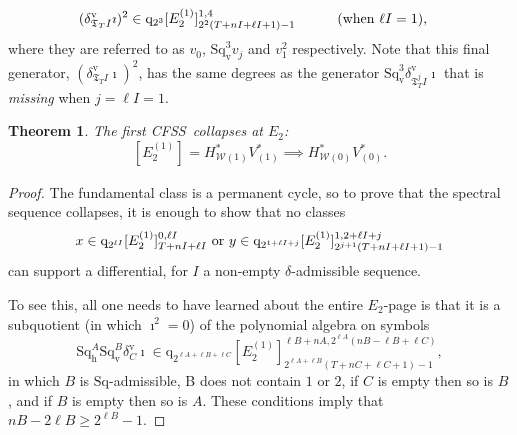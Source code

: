 \documentclass[11pt]{amsart} \renewcommand{\baselinestretch}{1.2}
\theoremstyle{plain}
\newtheorem{thm}{Theorem}[section] %
\numberwithin{equation}{section} %
\theoremstyle{plain}
\newtheorem{thm}{Theorem}[chapter] %
\numberwithin{equation}{chapter} %
\newcommand{\calw}{\mathcal{W}}
\newcommand{\quadgrad}[1]{\mathrm{q}_{#1}}
\newcommand{\Sq}{\mathrm{Sq}}
\newcommand{\TOP}{\mathfrak{T}}
\newcommand{\E}[5]{[E^{#1}_{#2}#3]^{#4}_{#5}}
\newcommand{\uver}{^\mathrm{v}}
\newcommand{\dver}{_\mathrm{v}}
\newcommand{\dhor}{_\mathrm{h}}
\newcommand{\Sqh}{\mathrm{Sq}\dhor}
\newcommand{\Sqv}{\mathrm{Sq}\dver}
\newcommand{\deltav}{\delta\uver}
\newcommand{\CFSS}{CFSS}
\begin{document}
\begin{Calculations of HWn}
\begin{alignat}{2}
(\deltav_{\TOP_T I}\imath)^{2}&\in 
\quadgrad{2^{3}}\E{(1)}{2}{}{1,4}{2^{2}(T+nI+\ell I+1)-1}
&\qquad&\textup{(when $\ell I=1$)},
\label{last generator}
\end{alignat}
where they are referred to  as $v_0$, $\Sqv^3v_j$ and $v_1^2$ respectively.
Note that this final generator, $(\deltav_{\TOP_T I}\imath)^{2}$, has the same degrees as the generator $\Sqv^{3}\deltav_{\TOP_T^j\!I}\imath$ that is \emph{missing} when $j=\ell I=1$.
\begin{thm}
The first \CFSS\ collapses at $E_2$:
\[\E{(1)}{2}{}{}{}=H^*_{\calw(1)}V^*_{(1)}\implies H^*_{\calw(0)}V^*_{(0)}.\]
\end{thm}
\begin{proof}
The fundamental class is a permanent cycle, so to prove that the spectral sequence collapses, it is enough to show that no classes
\[x\in \quadgrad{2^{\ell I}}\E{(1)}{2}{}{0,\ell I}{T+nI+\ell I}\textup{ or }y\in \quadgrad{2^{1+\ell I+j}}\E{(1)}{2}{}{1,2+\ell I+j}{2^{j+1}(T+nI+\ell I+1)-1}\]
can support a differential, for $I$ a non-empty $\delta$-admissible sequence.

To see this, all one needs to have learned about the entire $E_2$-page is that it is a subquotient (in which $\imath^2=0$) of the polynomial algebra on symbols
\[\Sqh^A\Sqv^B\deltav_C\imath\in \quadgrad{2^{\ell A+\ell B+\ell C}}\E{(1)}{2}{}{\ell B+nA,2^{\ell A}(nB-\ell B+\ell C)}{2^{\ell A+\ell B}(T+nC+\ell C+1)-1},\]
in which $B$ is $\Sq$-admissible, B does not contain $1$ or $2$, if $C$ is empty then so is $B$, and if $B$ is empty then so is $A$. These conditions imply that $nB-2\ell B\geq2^{\ell B}-1$.  %


\end{proof}
\end{Calculations of HWn}
\end{document}
